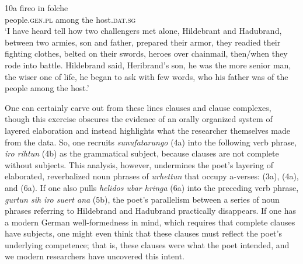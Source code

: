 10a \tab \gll fireo       in     folche\\
         people.\textsc{gen.pl}  among   the host.\textsc{dat.sg}\\

\glt ‘I have heard tell how two challengers met alone, Hildebrant and Hadubrand, between two armies, son and father, prepared their armor, they readied their fighting clothes, belted on their swords, heroes over chainmail, then/when they rode into battle. Hildebrand said, Heribrand’s son, he was the more senior man, the wiser one of life, he began to ask with few words, who his father was of the people among the host.’
    \z

\begin{sloppypar}
\noindent One can certainly carve out from these lines clauses and clause complexes, though this exercise obscures the evidence of an orally organized system of layered elaboration and instead highlights what the researcher themselves made from the data. So, one recruits \textit{sunufatarungo} (4a) into the following verb phrase, \textit{iro rihtun} (4b) as the grammatical subject, because clauses are not complete without subjects. This analysis, however, undermines the poet’s layering of elaborated, reverbalized noun phrases of \textit{urhettun} that occupy a-verses: (3a), (4a), and (6a). If one also pulls \textit{helidos ubar hringa} (6a) into the preceding verb phrase, \textit{gurtun sih iro suert ana} (5b), the poet’s parallelism between a series of noun phrases referring to Hildebrand and Hadubrand practically disappears. If one has a modern German well-formedness in mind, which requires that complete clauses have subjects, one might even think that these clauses must reflect the poet’s underlying competence; that is, these clauses were what the poet intended, and we modern researchers have uncovered this intent.
\end{sloppypar}

